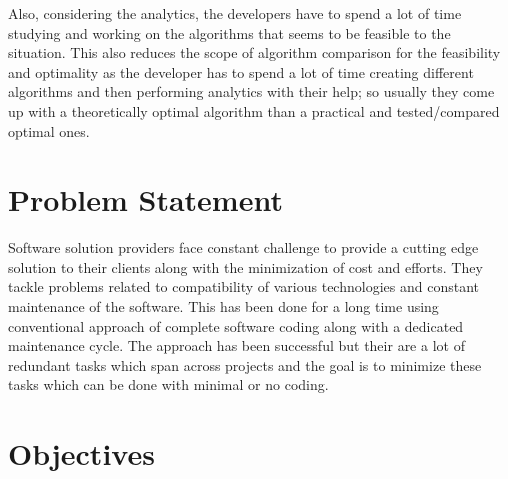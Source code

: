 \documentclass[a4paper,12pt]{report}
\begin{document}
    Also, considering the analytics, the developers have to spend a lot of time studying and working on the algorithms that seems to be feasible to the situation. This also reduces the scope of algorithm comparison for the feasibility and optimality as the developer has to spend a lot of time creating different algorithms and then performing analytics with their help; so usually they come up with a theoretically optimal algorithm than a practical and tested/compared optimal ones.
    \section{Problem Statement}
    Software solution providers face constant challenge to provide a cutting edge solution to their clients along with the minimization of cost and efforts. They tackle problems related to compatibility of various technologies and constant maintenance of the software. This has been done for a long time using conventional approach of complete software coding along with a dedicated maintenance cycle. The approach has been successful but their are a lot of redundant tasks which span across projects and the goal is to minimize these tasks which can be done with minimal or no coding.    
    \section{Objectives}
\end{document}
